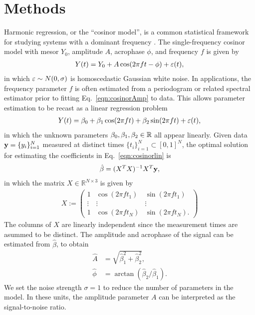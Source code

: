 \documentclass{article}
\begin{document}
\section{Methods}
Harmonic regression, or the ``cosinor model'', is a common statistical framework for studying systems with a dominant frequency \cite{cornelissen2014cosinor}. The single-frequency cosinor model with mesor $Y_0$, amplitude $A$, acrophase $\phi$, and frequency $f$ is given by 
\begin{align}
    Y(t) =Y_0+ A \cos(2\pi f t - \phi) + \varepsilon(t) \label{eqn:cosinorAmp},
\end{align}
in which $\varepsilon \sim N(0,\sigma)$ is homoscedastic Gaussian white noise. In applications, the frequency parameter $f$ is often estimated from a periodogram or related spectral estimator prior to fitting Eq.~\eqref{eqn:cosinorAmp}  to data. This allows parameter estimation to be recast as a linear regression problem
\begin{align}
    Y(t) = \beta_0 + \beta_1 \cos(2\pi f t ) + \beta_2 \sin(2\pi f t) + \varepsilon(t), \label{eqn:cosinorlin}
\end{align}
in which the unknown parameters $\beta_0,\beta_1, \beta_2 \in {\mathbb{R}}$ all appear linearly. Given data $\mathbf{y}=\{y_i\}_{i=1}^{N}$ measured at distinct times $\{t_i\}_{i=1}^{N} \subset [0,1]^N$, the optimal solution for estimating the coefficients in Eq.~\eqref{eqn:cosinorlin} is 
\begin{align}
    \hat{\beta} = (X^T X)^{-1}X^T \mathbf{y},\label{eqn:betahat}
\end{align}
in which the matrix $X\in \mathbb{R}^{N\times 3}$ is given by
\begin{align}\label{eqn:matX}
    X := \begin{pmatrix}
        1 & \cos(2\pi f t_1) & \sin(2\pi f t_1) \\
       \vdots  &  \vdots             & \vdots \\
        1 & \cos(2\pi f t_N) & \sin(2\pi f t_N). 
    \end{pmatrix}
\end{align}
The columns of $X$ are linearly independent since the measurement times are asummed to be distinct. The amplitude and acrophase of the signal can be estimated from $\hat{\beta}$, to obtain
\begin{align}
    \hat{A}    &= \sqrt{\hat{\beta}_1^2 + \hat{\beta}_2^2}, \label{eqn:amp}\\
    \hat{\phi} &= \arctan{(\hat{\beta}_2/\hat{\beta}_1)}\label{eqn:acro}.
\end{align}
We set the noise strength $\sigma=1$ to reduce the number of parameters in the model. In these units, the amplitude parameter $A$ can be interpreted as the signal-to-noise ratio. 
\end{document}
